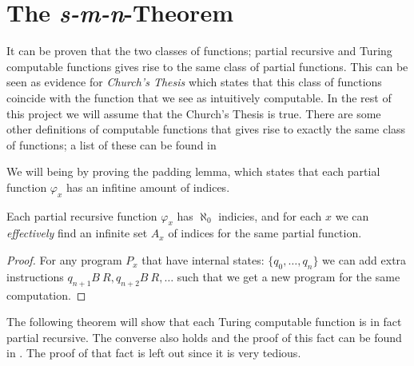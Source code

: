 \documentclass[../main.tex]{subfiles}
\begin{document}
\section{The \textit{s-m-n}-Theorem}

It can be proven that the two classes of functions; partial recursive and Turing
computable functions gives rise to the same class of partial functions. This
can be seen as evidence for \textit{Church's Thesis} which states that this
class of functions coincide with the function that we see as intuitively
computable. In the rest of this project we will assume that the Church's Thesis
is true. There are some other definitions of computable functions that gives
rise to exactly the same class of functions; a list of these can be found in
\parencite{Cutland1980}

We will being by proving the padding lemma, which states that each partial
function $\varphi_x$ has an infitine amount of indices.
\begin{lem}
	Each partial recursive function $\varphi_x$ has $\aleph_0$ indicies,
	and for each $x$ we can \textit{effectively} find an infinite set $A_x$
	of indices for the same partial function.
\end{lem}
\begin{proof}
	For any program $P_x$ that have internal states: $\{q_0,\ldots, q_n\}$
	we can add extra instructions $q_{n+1}B\ R ,q_{n+2}B\ R,\ldots$ such
	that we get a new program for the same computation.
\end{proof}

The following theorem will show that each Turing computable function is in fact
partial recursive. The converse also holds and the proof of this fact can be
found in \parencite{Kleene1952}. The proof of that fact is left out since it is
very tedious.
\end{document}

